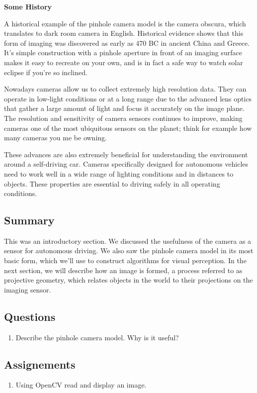 \begin{framed}
\begin{remark}{\textbf{Some History}}

A historical example of the pinhole camera model
is the camera obscura, which translates to
dark room camera in English. Historical evidence shows that this form of imaging
was discovered as early as 470 BC in ancient
China and Greece. It's simple construction with a pinhole aperture in front of an imaging surface makes it
easy to recreate on your own, and is in fact a safe way to watch solar eclipse if
you're so inclined.
\end{remark}
\end{framed}


Nowadays  cameras allow us to collect extremely high resolution data. They can operate in
low-light conditions or at a long range due to the advanced lens optics
that gather a large amount of light and focus it
accurately on the image plane. The resolution and sensitivity of camera sensors
continues to improve, making cameras one of the most ubiquitous sensors on the planet; think for example how many cameras you me be owning.

These advances are also
extremely beneficial for understanding the environment around a self-driving car.  
Cameras specifically designed for autonomous vehicles need to work well in a wide range of lighting conditions and
in distances to objects. These properties are essential to driving safely in all operating conditions. 


\subsection{Summary}

This was an introductory section. We discussed the usefulness of the camera as a sensor
for autonomous driving. We also saw the pinhole
camera model in its most basic form, which we'll use
to construct algorithms for visual perception. In the next section, we will describe how an image is formed, a process referred to
as projective geometry, which relates objects in the world to their projections on the imaging sensor.

\subsection{Questions}

\begin{enumerate}
\item Describe the pinhole camera model. Why is it useful?
\end{enumerate}

\subsection{Assignements}

\begin{enumerate}
\item Using OpenCV read and display an image.
\end{enumerate}

